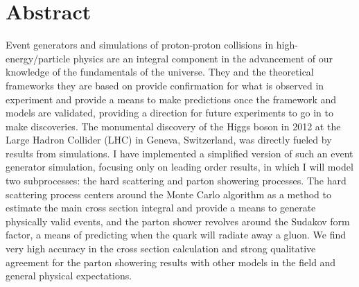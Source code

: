 \section*{Abstract}

Event generators and simulations of proton-proton collisions in high-energy/particle physics are an integral component in the advancement of our knowledge of the fundamentals of the universe. They and the theoretical frameworks they are based on provide confirmation for what is observed in experiment and provide a means to make predictions once the framework and models are validated, providing a direction for future experiments to go in to make discoveries. The monumental discovery of the Higgs boson in 2012 at the Large Hadron Collider (LHC) in Geneva, Switzerland, was directly fueled by results from simulations. I have implemented a simplified version of such an event generator simulation, focusing only on leading order results, in which I will model two subprocesses: the hard scattering and parton showering processes. The hard scattering process centers around the Monte Carlo algorithm as a method to estimate the main cross section integral and provide a means to generate physically valid events, and the parton shower revolves around the Sudakov form factor, a means of predicting when the quark will radiate away a gluon. We find very high accuracy in the cross section calculation and strong qualitative agreement for the parton showering results with other models in the field and general physical expectations.


